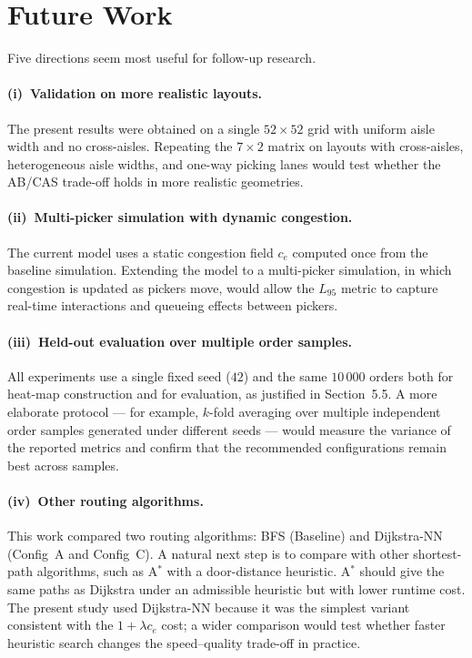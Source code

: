 \documentclass[12pt,a4paper]{article}
\begin{document}
\section{Future Work}

Five directions seem most useful for follow-up research.

\paragraph{(i)~Validation on more realistic layouts.}
The present results were obtained on a single $52 \times 52$ grid with
uniform aisle width and no cross-aisles. Repeating the $7 \times 2$
matrix on layouts with cross-aisles, heterogeneous aisle widths, and
one-way picking lanes would test whether the AB/CAS trade-off holds in
more realistic geometries.

\paragraph{(ii)~Multi-picker simulation with dynamic congestion.}
The current model uses a static congestion field $c_e$ computed once
from the baseline simulation. Extending the model to a multi-picker
simulation, in which congestion is updated as pickers move, would
allow the $L_{95}$ metric to capture real-time interactions and
queueing effects between pickers.

\paragraph{(iii)~Held-out evaluation over multiple order samples.}
All experiments use a single fixed seed ($42$) and the same $10\,000$
orders both for heat-map construction and for evaluation, as justified
in Section~5.5. A more elaborate protocol --- for example, $k$-fold
averaging over multiple independent order samples generated under
different seeds --- would measure the variance of the reported metrics
and confirm that the recommended configurations remain best across
samples.

\paragraph{(iv)~Other routing algorithms.}
This work compared two routing algorithms: BFS (Baseline) and
Dijkstra-NN (Config~A and Config~C). A natural next step is to compare
with other shortest-path algorithms, such as A$^{*}$ with a
door-distance heuristic. A$^{*}$ should give the same paths as
Dijkstra under an admissible heuristic but with lower runtime cost.
The present study used Dijkstra-NN because it was the simplest variant
consistent with the $1 + \lambda c_e$ cost; a wider comparison would
test whether faster heuristic search changes the speed--quality
trade-off in practice.
\end{document}
